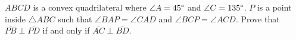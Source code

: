 
$ABCD$ is a convex quadrilateral where $\angle A = 45\degree$ and $\angle C = 135 \degree$. $P$ is a point inside $\triangle ABC$ such that $\angle BAP = \angle CAD$ and $\angle BCP = \angle ACD$. Prove that $\overline{PB} \perp \overline{PD}$ if and only if $\overline{AC} \perp \overline{BD}$.
